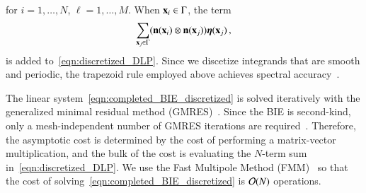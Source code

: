 \documentclass[preprint, 10pt]{elsarticle}
\begin{document}
for $i=1,\ldots,N$, $\ell=1,\ldots,M$.  When ${\mathbf{x}}_i \in \Gamma$, the term 
\begin{align}
  \sum_{{\mathbf{x}}_j \in \Gamma} ({\mathbf{n}}({\mathbf{x}}_i) \otimes
      {\mathbf{n}}({\mathbf{x}}_j)){\boldsymbol\eta}({\mathbf{x}}_j) \, ,
\end{align}
is added to~\eqref{eqn:discretized_DLP}.  Since we discetize integrands that are smooth and periodic, the trapezoid rule employed above achieves spectral accuracy~\cite{tre-wei2014}.  

The linear system~\eqref{eqn:completed_BIE_discretized} is solved iteratively with the generalized minimal residual method (GMRES)~\cite{saa-sch1986}.  Since the BIE is second-kind, only a mesh-independent number of GMRES iterations are required~\cite{cam-ips-kel-mey-xue1996}.  Therefore, the asymptotic cost is determined by the cost of performing a matrix-vector multiplication, and the bulk of the cost is evaluating the $N$-term sum in~\eqref{eqn:discretized_DLP}. We use the Fast Multipole Method (FMM)~\cite{gre-rok1987, gre-gre-may1992} so that the cost of solving~\eqref{eqn:completed_BIE_discretized} is ${\mathcal{O}}(N)$ operations.
 
\end{document}
